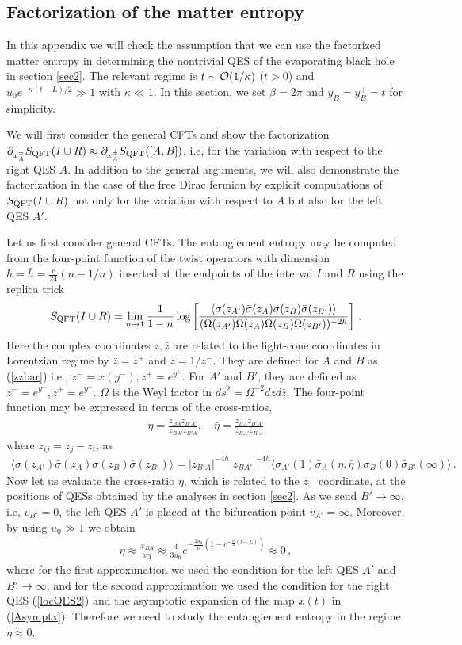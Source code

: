 \documentclass[12pt]{article}
\newcommand{\h}{\theta}
\newcommand{\f}{\frac}
\newcommand{\ra}{\rangle}
\let\z=\zeta \let\h=\eta \let\q=\theta \let\k=\kappa
\let\sg=\sigma \let\t=\tau \let\u=\upsilon \let\c=\chi
\let\f=\frac
\def\ba{\begin{eqnarray}}
\def\ea{\end{eqnarray}}
\numberwithin{equation}{section}
\def\t{{\theta}}
\def\k{\kappa}
\def\sg{{\sigma}}
\def\CO{{\cal O}}
\newcommand{\bz}{\bar{z}}
\def\pp{\partial}
\def\ba{\begin{eqnarray}}
\def\ea{\end{eqnarray}}
\def\f {\frac}
\def\ra{\rightarrow}
\def\q{\quad}
\def\z{\bar{z}}
\begin{document}
\begin{spacing}{1.1}
\appendix



\section{Factorization of the matter entropy}\label{app:matterentropy}

In this appendix we will check the assumption that we can use the factorized matter entropy in determining the nontrivial QES of the evaporating black hole in section \ref{sec2}. 
The relevant regime is $t\sim  \CO(1/\kappa)$ ($t>0$) and $u_0e^{-\kappa(t-L)/2}\gg 1$ with $\kappa\ll 1$. In this section, we set $\beta=2\pi$ and $y^-_B=y^+_B=t$ for simplicity. 
 
We will first consider the general CFTs and show  the factorization $\pp_{x^\pm_{A}}S_{\rm QFT}(I\cup R)\approx\pp_{x^\pm_{A}}S_{\rm QFT}([A,B])$, i.e, for the variation with respect to the right QES $A$. In addition to the general arguments,  we will also demonstrate the factorization in the case of the free Dirac fermion by explicit computations of $S_{\rm QFT}(I\cup R)$ not only for the variation with respect to $A$ but also for the left QES $A'$.

Let us first consider general CFTs. The entanglement entropy may be computed from the four-point function of the twist operators with dimension $h=\bar{h}=\f{c}{24}(n-1/n)$ inserted at the endpoints of the interval $I$ and $R$ using the replica trick
 \ba
 S_{\rm QFT}(I\cup R)=\lim_{n\ra 1}\frac{1}{1-n}\log \left[\frac{\langle\sg(z_{A'})\bar{\sg}(z_{A})\sg(z_B)\bar{\sg}(z_{B'})\rangle}{(\Omega(z_{A'}) \Omega(z_{A})\Omega(z_{B}) \Omega(z_{B'}))^{-2h}}\right]\, .
 \ea
Here the complex coordinates $z,\z$ are related to the  light-cone coordinates in Lorentzian regime by $\z=z^+$ and $z=1/z^-$. They are defined for $A$ and $B$ as (\ref{zzbar}) i.e., $z^- = x(y^-), z^+ =e^{y^+}$. For $A'$ and $B'$, they are defined as $z^- =e^{y^-}, z^+ =e^{y^+}$.  $\Omega$ is the Weyl factor in $ds^2=\Omega^{-2}dzd\z$.  The four-point  function may be expressed in terms of the cross-ratios,
\ba
\eta=\f{z_{BA}z_{B'A'}}{z_{BA'}z_{B'A}},  \quad
\bar{\eta}=\f{\bz_{BA}\bz_{B'A'}}{\bz_{BA'}\bz_{B'A}}
\ea
where $z_{ij}=z_j-z_i$, as
\ba
\langle\sg(z_{A'})\bar{\sg}(z_{A})\sg(z_B)\bar{\sg}(z_{B'})\rangle=|z_{B'A}|^{-4h}|z_{BA'}|^{-4h}\langle\sg_{A'}(1)\bar{\sg}_{A}(\eta,\bar{\eta})\sg_{B}(0)\bar{\sg}_{B'}(\infty)\rangle\, .
\ea
Now let us evaluate the cross-ratio $\eta$, which is related to the $z^-$ coordinate, at the positions of QESs obtained by the analyses in section \ref{sec2}. As we send $B'\ra\infty$, i.e, $v^-_{B'}=0$, the left QES $A'$ is placed at the bifurcation point $v^-_{A'}=\infty$. Moreover, by using $u_0 \gg 1$ we obtain
\ba
\eta\approx \f{x^-_{BA}}{x^-_A}\approx \f{4}{3u_0}e^{-\f{2u_0}{\kappa}(1-e^{-\f{\kappa}{2} (t-L)})}\approx 0\, ,
\ea
where for the first approximation we used the condition for the left QES $A'$ and $B'\ra \infty$, and for the second approximation we used  the condition for the right QES (\ref{locQES2}) and the asymptotic expansion of the map $x(t)$ in (\ref{Asymptx}).   Therefore we need to study the entanglement entropy in the regime $\eta \approx 0$. 



\end{spacing}
\end{document}
